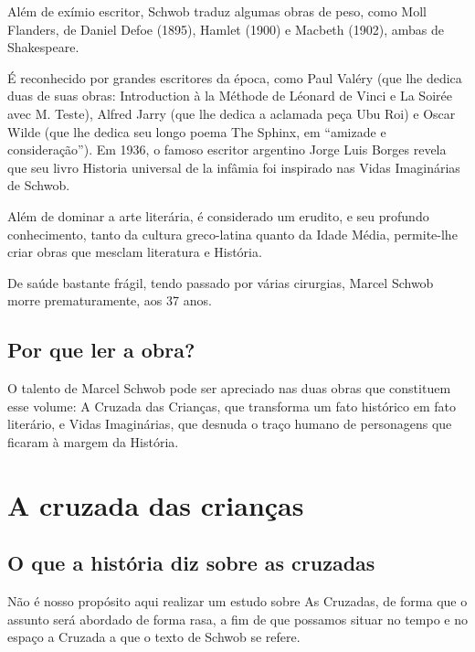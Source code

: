 \documentclass[12pt]{extarticle}
\begin{document}


Além de exímio escritor, Schwob traduz algumas obras de peso, como Moll
Flanders, de Daniel Defoe (1895), Hamlet (1900) e Macbeth (1902), ambas
de Shakespeare.

É reconhecido por grandes escritores da época, como Paul Valéry (que lhe
dedica duas de suas obras: Introduction à la Méthode de Léonard de Vinci
e La Soirée avec M. Teste), Alfred Jarry (que lhe dedica a aclamada peça
Ubu Roi) e Oscar Wilde (que lhe dedica seu longo poema The Sphinx, em
``amizade e consideração''). Em 1936, o famoso escritor argentino Jorge
Luis Borges revela que seu livro Historia universal de la infâmia foi
inspirado nas Vidas Imaginárias de Schwob.




Além de dominar a arte literária, é considerado um erudito, e seu
profundo conhecimento, tanto da cultura greco-latina quanto da Idade
Média, permite-lhe criar obras que mesclam literatura e História.

De saúde bastante frágil, tendo passado por várias cirurgias, Marcel
Schwob morre prematuramente, aos 37 anos.

\subsection{Por que ler a obra?}

O talento de Marcel Schwob pode ser apreciado nas duas obras que
constituem esse volume: A Cruzada das Crianças, que transforma um fato
histórico em fato literário, e Vidas Imaginárias, que desnuda o traço
humano de personagens que ficaram à margem da História.

\section{A cruzada das crianças}


\subsection{O que a história diz sobre as cruzadas}

Não é nosso propósito aqui realizar um estudo sobre As Cruzadas, de
forma que o assunto será abordado de forma rasa, a fim de que possamos
situar no tempo e no espaço a Cruzada a que o texto de Schwob se refere.
\end{document}
